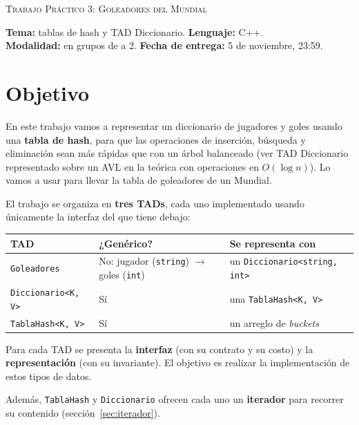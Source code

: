 \documentclass{article}
\newcommand{\titulo}[2]{%
\begin{center}%
{\Large\textsc{Trabajo Práctico #1: #2}}
\end{center}}
\begin{document}
\titulo{3}{Goleadores del Mundial}

\begin{center}
\begin{minipage}{0.85\textwidth}
\small
\textbf{Tema:} tablas de hash y TAD Diccionario. \hfill
\textbf{Lenguaje:} C++. \\
\textbf{Modalidad:} en grupos de a 2. \hfill
\textbf{Fecha de entrega:} 5 de noviembre, 23:59.
\end{minipage}
\end{center}

\section{Objetivo}

En este trabajo vamos a representar un diccionario de jugadores y goles usando una \textbf{tabla de hash}, para que las operaciones de inserción, búsqueda y eliminación sean más rápidas que con un árbol balanceado (ver TAD Diccionario representado sobre un AVL en la teórica con
operaciones en $O(\log n)$).
Lo vamos a usar para llevar la tabla de
goleadores de un Mundial.

El trabajo se organiza en \textbf{tres TADs}, cada uno implementado
usando únicamente la interfaz del que tiene debajo:

\begin{center}
\begin{tabular}{@{}lll@{}}
\toprule
TAD & ¿Genérico? & Se representa con \\
\midrule
\texttt{Goleadores} & No: jugador (\texttt{string}) $\to$ goles (\texttt{int}) & un \texttt{Diccionario<string, int>} \\
\texttt{Diccionario<K, V>} & Sí & una \texttt{TablaHash<K, V>} \\
\texttt{TablaHash<K, V>} & Sí & un arreglo de \emph{buckets} \\
\bottomrule
\end{tabular}
\end{center}

Para cada TAD se presenta la \textbf{interfaz} (con su contrato y su costo) y
la \textbf{representación} (con su invariante). El objetivo es realizar la implementación de estos tipos de datos.

Además, \texttt{TablaHash} y \texttt{Diccionario} ofrecen cada uno un
\textbf{iterador} para recorrer su contenido (sección~\ref{sec:iterador}).
\end{document}
